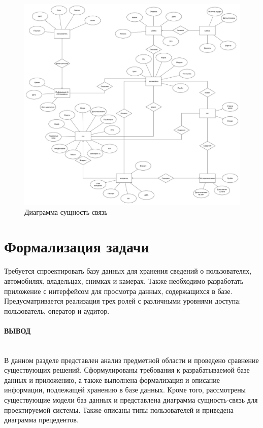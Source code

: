 \begin{figure}[H]
    \centering
    \includegraphics[width=1\linewidth]{images/diograms/er.jpg}
    \caption{Диаграмма сущность-связь}
    \label{fig:er_diogramm}
\end{figure}

\section{Формализация задачи}

Требуется спроектировать базу данных для хранения сведений о пользователях, автомобилях, владельцах, снимках и камерах. Также необходимо разработать приложение с интерфейсом для просмотра данных, содержащихся в базе. Предусматривается реализация трех ролей с различными уровнями доступа: пользователь, оператор и аудитор.

\paragraph*{ВЫВОД} ${}$ \\

В данном разделе представлен анализ предметной области и проведено сравнение существующих решений. Сформулированы требования к разрабатываемой базе данных и приложению, а также выполнена формализация и описание информации, подлежащей хранению в базе данных. Кроме того, рассмотрены существующие модели баз данных и представлена диаграмма сущность-связь для проектируемой системы. Также описаны типы пользователей и приведена диаграмма прецедентов.

